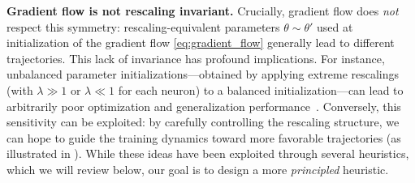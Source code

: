 \documentclass{article}
\theoremstyle{plain}
\theoremstyle{definition}
\theoremstyle{remark}
\begin{document}
\textbf{Gradient flow is not rescaling invariant.} 
Crucially, gradient flow does \emph{not} respect this symmetry: rescaling-equivalent parameters $\theta \sim \theta'$ used 
at initialization of the gradient flow \eqref{eq:gradient_flow} generally lead to different trajectories. 
This lack of invariance has profound implications. For instance, unbalanced parameter initializations—obtained 
by applying extreme rescalings (with $\lambda \gg 1$ or $\lambda \ll 1$ for each neuron) to a balanced 
initialization—can lead to arbitrarily poor optimization and generalization performance~\citep{neyshabur2015path}. 
Conversely, this sensitivity can be exploited: by carefully controlling the rescaling structure, we can 
hope to guide the training dynamics toward more favorable trajectories (as illustrated in ). 
While these ideas have been exploited through several heuristics, which we will review below, 
our goal is to design a more \emph{principled} heuristic.
\end{document}
